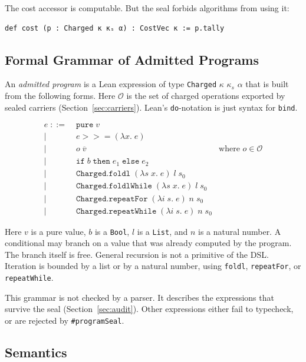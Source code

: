 \documentclass[acmsmall,nonacm]{acmart}
\begin{document}
The cost accessor is computable.
But the seal forbids algorithms from using it:

\begin{lstlisting}
def cost (p : Charged κ κₛ α) : CostVec κ := p.tally
\end{lstlisting}

\subsection{Formal Grammar of Admitted Programs}\label{sec:grammar}

An \emph{admitted program} is a Lean expression of type \lstinline{Charged} $\kappa$ $\kappa_s$ $\alpha$ that is built from the following forms.
Here $\mathcal{O}$ is the set of charged operations exported by sealed carriers (Section~\ref{sec:carriers}).
Lean's \lstinline{do}-notation is just syntax for \lstinline{bind}.

\begin{align*}
e \;::=\;& \texttt{pure}\; v \\
  \mid\;& e \mathbin{>\!\!>\!\!=} (\lambda x.\; e) \\
  \mid\;& o\; \overline{v} &\text{where } o \in \mathcal{O} \\
  \mid\;& \texttt{if}\; b\; \texttt{then}\; e_1\; \texttt{else}\; e_2 \\
  \mid\;& \texttt{Charged.foldl}\; (\lambda s\; x.\; e)\; l\; s_0 \\
  \mid\;& \texttt{Charged.foldlWhile}\; (\lambda s\; x.\; e)\; l\; s_0 \\
  \mid\;& \texttt{Charged.repeatFor}\; (\lambda i\; s.\; e)\; n\; s_0 \\
  \mid\;& \texttt{Charged.repeatWhile}\; (\lambda i\; s.\; e)\; n\; s_0
\end{align*}

Here $v$ is a pure value, $b$ is a \lstinline{Bool}, $l$ is a \lstinline{List}, and $n$ is a natural number.
A conditional may branch on a value that was already computed by the program.
The branch itself is free.
General recursion is not a primitive of the DSL.
Iteration is bounded by a list or by a natural number, using \lstinline{foldl}, \lstinline{repeatFor}, or \lstinline{repeatWhile}.

This grammar is not checked by a parser.
It describes the expressions that survive the seal (Section~\ref{sec:audit}).
Other expressions either fail to typecheck, or are rejected by \lstinline{#programSeal}.

\subsection{Semantics}\label{sec:semantics}
\end{document}
